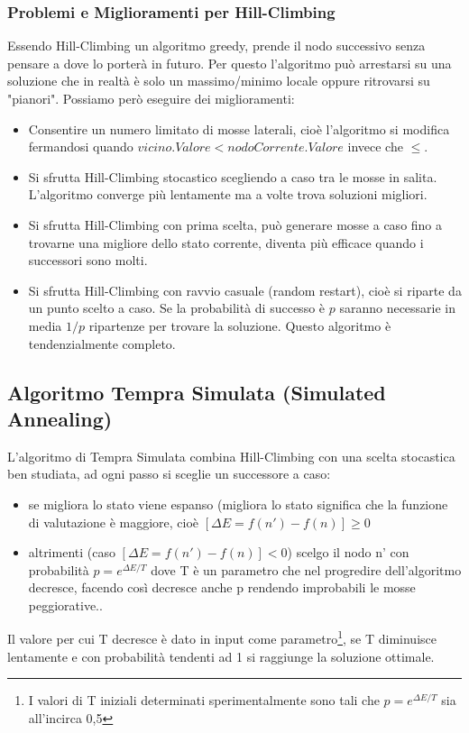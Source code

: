 \documentclass{article}
\begin{document}
\subsubsection{Problemi e Miglioramenti per Hill-Climbing}
Essendo Hill-Climbing un algoritmo greedy, prende il nodo successivo senza pensare a dove lo porterà in futuro. Per questo l'algoritmo può arrestarsi su una soluzione che in realtà è solo un massimo/minimo locale oppure ritrovarsi su "pianori". Possiamo però eseguire dei miglioramenti:
\begin{itemize}
    \item Consentire un numero limitato di mosse laterali, cioè l'algoritmo si modifica fermandosi quando $vicino.Valore < nodoCorrente.Valore$ invece che $\leq$.
    \item Si sfrutta Hill-Climbing stocastico scegliendo a caso tra le mosse in salita. L'algoritmo converge più lentamente ma a volte trova soluzioni migliori.
    \item Si sfrutta Hill-Climbing con prima scelta, può generare mosse a caso fino a trovarne una migliore dello stato corrente, diventa più efficace quando i successori sono molti.
    \item Si sfrutta Hill-Climbing con ravvio casuale (random restart), cioè si riparte da un punto scelto a caso. Se la probabilità di successo è $p$ saranno necessarie in media $1/p$ ripartenze per trovare la soluzione. Questo algoritmo è tendenzialmente completo.
\end{itemize}

\subsection{Algoritmo Tempra Simulata (Simulated Annealing)}
L'algoritmo di Tempra Simulata combina Hill-Climbing con una scelta stocastica ben studiata, ad ogni passo si sceglie un successore a caso:
\begin{itemize}
    \item se migliora lo stato viene espanso (migliora lo stato significa che la funzione di valutazione è maggiore, cioè $[\Delta E = f(n')-f(n)] \geq 0$
    \item altrimenti (caso $[\Delta E = f(n')-f(n)] < 0$) scelgo il nodo n' con probabilità $p=e^{\Delta E / T}$ dove T è un parametro che nel progredire dell'algoritmo decresce, facendo così decresce anche p rendendo improbabili le mosse peggiorative..
\end{itemize}
Il valore per cui T decresce è dato in input come parametro\footnote{I valori di T iniziali determinati sperimentalmente sono tali che $p=e^{\Delta E / T}$ sia all'incirca 0,5}, se T diminuisce lentamente e con probabilità tendenti ad 1 si raggiunge la soluzione ottimale.
\clearpage
\end{document}
